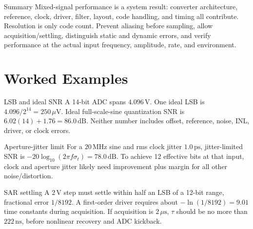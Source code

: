 \documentclass[10pt,letterpaper]{article}
\begin{document}
\begin{CornellSummaryBox}{Summary}
Mixed-signal performance is a system result: converter architecture, reference, clock, driver, filter, layout, code handling, and timing all contribute. Resolution is only code count. Prevent aliasing before sampling, allow acquisition/settling, distinguish static and dynamic errors, and verify performance at the actual input frequency, amplitude, rate, and environment.
\end{CornellSummaryBox}
\section{Worked Examples}
\begin{CornellExamBox}{LSB and ideal SNR}
A 14-bit ADC spans $4.096\,\mathrm{V}$. One ideal LSB is $4.096/2^{14}=250\,\mu\mathrm{V}$. Ideal full-scale-sine quantization SNR is $6.02(14)+1.76=86.0\,\mathrm{dB}$. Neither number includes offset, reference, noise, INL, driver, or clock errors.
\end{CornellExamBox}
\begin{CornellExamBox}{Aperture-jitter limit}
For a $20\,\mathrm{MHz}$ sine and rms clock jitter $1.0\,\mathrm{ps}$, jitter-limited SNR is $-20\log_{10}(2\pi f\sigma_t)=78.0\,\mathrm{dB}$. To achieve 12 effective bits at that input, clock and aperture jitter likely need improvement plus margin for all other noise/distortion.
\end{CornellExamBox}
\begin{CornellExamBox}{SAR settling}
A $2\,\mathrm{V}$ step must settle within half an LSB of a 12-bit range, fractional error $1/8192$. A first-order driver requires about $-\ln(1/8192)=9.01$ time constants during acquisition. If acquisition is $2\,\mu\mathrm{s}$, $\tau$ should be no more than $222\,\mathrm{ns}$, before nonlinear recovery and ADC kickback.
\end{CornellExamBox}
\end{document}
